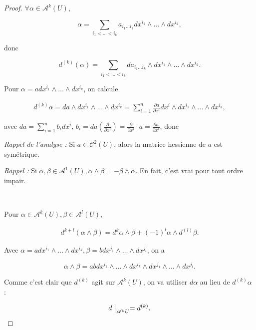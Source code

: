 \documentclass[french]{article}
\theoremstyle{definition}
\newcommand{\lesss}{<}
\newcommand{\less}{\lesss}
\begin{document}
\begin{proof}
  \(\forall \alpha \in \mathscr{A}^{k}(U)\),

  \[\alpha = \sum_{i_1 \less \dots \less i_k} a _{i_1 \dots i_k}d x^{i_1} \wedge \dots \wedge d x^{i_k},\]

  donc

  \[d ^{(k)}(\alpha) = \sum_{i_1 \less \dots \less i_k} d a _{i_1 \dots i_k} \wedge d x^{i_1} \wedge \dots \wedge d x^{i_k}.\]

  Pour \(\alpha = a d x^{i_1} \wedge \dots \wedge d x^{i_k}\), on calcule

  \begin{gather*}
    d ^{(k)}\alpha = da \wedge d x^{i_1}\wedge \dots \wedge d x^{i_k} = \sum_{i=1}^{n} \frac{\partial a }{\partial x ^{i}} d x^{i} \wedge d x^{i_1} \wedge \dots \wedge d x^{i_k},
  \end{gather*}

  avec \(da = \sum_{i=1}^{n} b_i d x^{i}\), \(b_i = da \left(\frac{\partial  }{\partial x ^{i}} \right) = \frac{\partial  }{\partial x ^{i}} \cdot a = \frac{\partial a }{\partial x ^{i}}\), donc


  \emph{Rappel de l'analyse :} Si \(a \in \mathcal{C}^2(U)\), alors la matrice hessienne de \(a\) est symétrique.

  \emph{Rappel :} Si \(\alpha, \beta \in \mathscr{A}^{1}(U), \alpha \wedge \beta = - \beta \wedge \alpha\). En fait, c'est vrai pour tout ordre impair.

  \

  Pour \(\alpha \in \mathscr{A}^{k}(U), \beta \in \mathscr{A}^{l}(U)\),

  \begin{gather*}
    d ^{k+l}(\alpha \wedge \beta) = d ^{k}\alpha \wedge \beta + (-1)^{l}\alpha \wedge d ^{(l)}\beta.
  \end{gather*}

  Avec \(\alpha = a d x^{i_1} \wedge \dots \wedge d x^{i_k}, \beta = b d x^{j_1}\wedge \dots \wedge d x^{j_l}\), on a

  \[\alpha \wedge \beta = ab d x^{i_1}\wedge \dots \wedge d x^{i_k}\wedge d x^{j_1}\wedge \dots \wedge d x^{j_l}.\]


  Comme c'est clair que \(d ^{(k)}\) agit sur \(\mathscr{A}^{k}(U)\), on va utiliser \(d \alpha\) au lieu de \(d ^{(k)}\alpha\) :

  \[d \bigm|_{\mathscr{A}^{k}U} = d ^{(k)}.\]
\end{proof}
\end{document}
